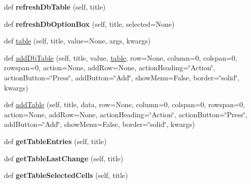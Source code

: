 \begin{DoxyCompactItemize}
\item 
\mbox{\label{class_python_01_g_u_i_1_1appjar_1_1gui_ae29cc2eb55a286d1308c66d4d8ac3123}} 
def {\bfseries refresh\+Db\+Table} (self, title)
\item 
\mbox{\label{class_python_01_g_u_i_1_1appjar_1_1gui_a0284f70d421d1f3cfd72517489a67260}} 
def {\bfseries refresh\+Db\+Option\+Box} (self, title, selected=None)
\item 
def \hyperlink{class_python_01_g_u_i_1_1appjar_1_1gui_a53e86304a35d41e135f8449ad83a3640}{table} (self, title, value=None, args, kwargs)
\item 
def \hyperlink{class_python_01_g_u_i_1_1appjar_1_1gui_af64997bd78a9608cb2b4965fc29d1506}{add\+Db\+Table} (self, title, value, \hyperlink{class_python_01_g_u_i_1_1appjar_1_1gui_a53e86304a35d41e135f8449ad83a3640}{table}, row=None, column=0, colspan=0, rowspan=0, action=None, add\+Row=None, action\+Heading=\char`\"{}Action\char`\"{}, action\+Button=\char`\"{}Press\char`\"{}, add\+Button=\char`\"{}Add\char`\"{}, show\+Menu=False, border=\char`\"{}solid\char`\"{}, kwargs)
\item 
def \hyperlink{class_python_01_g_u_i_1_1appjar_1_1gui_afed5cffabe4edde6b5d18c2b8c5b3858}{add\+Table} (self, title, data, row=None, column=0, colspan=0, rowspan=0, action=None, add\+Row=None, action\+Heading=\char`\"{}Action\char`\"{}, action\+Button=\char`\"{}Press\char`\"{}, add\+Button=\char`\"{}Add\char`\"{}, show\+Menu=False, border=\char`\"{}solid\char`\"{}, kwargs)
\item 
\mbox{\label{class_python_01_g_u_i_1_1appjar_1_1gui_ad52636dd598562b2caa1e0047c906ec3}} 
def {\bfseries get\+Table\+Entries} (self, title)
\item 
\mbox{\label{class_python_01_g_u_i_1_1appjar_1_1gui_afc809f12f4fcccf88a21b5f1c60aa17f}} 
def {\bfseries get\+Table\+Last\+Change} (self, title)
\item 
\mbox{\label{class_python_01_g_u_i_1_1appjar_1_1gui_ad79e67da7a4e0adbafff26b2f82737b0}} 
def {\bfseries get\+Table\+Selected\+Cells} (self, title)
\item 
\mbox{\label{class_python_01_g_u_i_1_1appjar_1_1gui_abaa43ccbe0971192a9e1ca6ae772e07c}} 

\end{DoxyCompactItemize}
